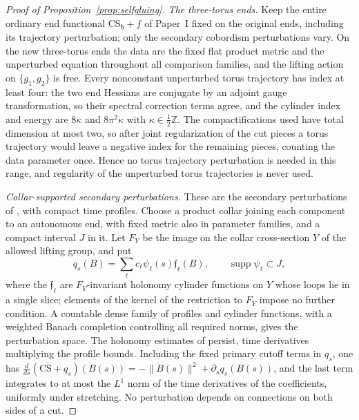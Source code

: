 \documentclass[11pt]{amsart}
\theoremstyle{definition}
\theoremstyle{remark}
\theoremstyle{plain}
\numberwithin{equation}{section}
\newcommand{\ZZ}{\mathbb Z}
\begin{document}
\begin{proof}[Proof of Proposition~\ref{prop:selfgluing}]
\emph{The three-torus ends.} Keep the entire ordinary end functional
$\mathrm{CS}_{\mathfrak h}+f$ of Paper~I fixed on the original ends,
including its trajectory perturbation; only the secondary cobordism
perturbations vary. On the new three-torus ends the data are the fixed flat
product metric and the unperturbed equation throughout all comparison
families, and the lifting action on $\{g_1,g_2\}$ is free. Every nonconstant
unperturbed torus trajectory has index at least four: the two end Hessians
are conjugate by an adjoint gauge transformation, so their spectral
correction terms agree, and the cylinder index and energy are $8\kappa$ and
$8\pi^2\kappa$ with $\kappa\in\frac12\ZZ$. The compactifications used have
total dimension at most two, so after joint regularization of the cut pieces
a torus trajectory would leave a negative index for the remaining pieces,
counting the data parameter once. Hence no torus trajectory perturbation is
needed in this range, and regularity of the unperturbed torus trajectories is
never used.

\emph{Collar-supported secondary perturbations.} These are the secondary
perturbations of \cite[Sections~3.7 and~3.9]{KM-unknot}, with compact time
profiles. Choose a product collar joining each component to an autonomous
end, with fixed metric also in parameter families, and a compact interval $J$
in it. Let $F_Y$ be the image on the collar cross-section $Y$ of the allowed
lifting group, and put
\begin{equation}\label{eq:ordinary-secondary}
 q_s(B)=\sum_\ell c_\ell\psi_\ell(s)\mathfrak f_\ell(B),
 \qquad \operatorname{supp}\psi_\ell\subset J,
\end{equation}
where the $\mathfrak f_\ell$ are $F_Y$-invariant holonomy cylinder functions
on $Y$ whose loops lie in a single slice; elements of the kernel of the restriction to $F_Y$
impose no further condition. A countable dense family of
profiles and cylinder functions, with a weighted Banach completion
controlling all required norms, gives the perturbation space. The holonomy
estimates of \cite[Propositions~3.7 and~3.15]{KM-instantons} persist, time
derivatives multiplying the profile bounds. Including the fixed primary
cutoff terms in $q_s$, one has
$\frac{d}{ds}(\mathrm{CS}+q_s)(B(s))=-\|\dot B(s)\|^2+\partial_sq_s(B(s))$,
and the last term integrates to at most the $L^1$ norm of the time
derivatives of the coefficients, uniformly under stretching. No perturbation
depends on connections on both sides of a cut.


\end{proof}
\end{document}
